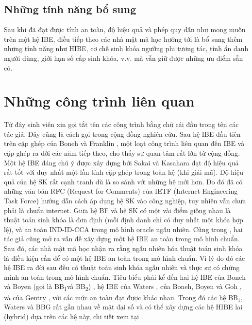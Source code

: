 \documentclass[class=report, crop=false]{standalone}
\begin{document}
		\subsection{Những tính năng bổ sung}
			Sau khi đã đạt được tính an toàn, độ hiệu quả và phép quy dẫn như mong muốn trên một hệ IBE, điều tiếp theo các nhà mật mã học hướng tới là bổ sung thêm những tính năng như HIBE, cơ chế sinh khóa ngưỡng phi tương tác, tính ẩn danh người dùng, giới hạn số cấp sinh khóa, v.v. mà vẫn giữ được những ưu điểm sẵn có.
		
	\section{Những công trình liên quan}
		Từ đây sinh viên xin gọi tắt tên các công trình bằng chữ cái đầu trong tên các tác giả. Đây cũng là cách gọi trong cộng đồng nghiên cứu. Sau hệ IBE đầu tiên trên cặp ghép của Boneh và Franklin \cite{DBLP:conf/crypto/BonehF01}, một loạt công trình liên quan đến IBE và cặp ghép ra đời các năm tiếp theo, cho thấy sự quan tâm rất lớn từ cộng đồng. Một hệ IBE đáng chú ý được xây dựng bởi Sakai và Kasahara \cite{DBLP:journals/iacr/SakaiK03} đạt độ hiệu quả rất tốt với duy nhất một lần tính cặp ghép trong toàn hệ (khi giải mã). Độ hiệu quả của hệ SK rất cạnh tranh dù là so sánh với những hệ mới hơn. Do đó đã có những văn bản RFC (Request for Comments) của IETF (Internet Engineering Task Force) \cite{rfc6508, rfc6509} hướng dẫn cách áp dụng hệ SK vào công nghiệp, tuy nhiên vẫn chưa phải là chuẩn internet. Giữa hệ BF và hệ SK có một vài điểm giống nhau là thuật toán sinh khóa là đơn định (mỗi định danh chỉ có duy nhất một khóa hợp lệ), và an toàn IND-ID-CCA trong mô hình oracle ngẫu nhiên. Cũng trong \cite{DBLP:conf/crypto/BonehF01}, hai tác giả cũng mở ra vấn đề xây dựng một hệ IBE an toàn trong mô hình chuẩn. Sau đó, các nhà mật mã học nhận ra rằng ngẫu nhiên hóa thuật toán sinh khóa là điều kiện cần để có một hệ IBE an toàn trong mô hình chuẩn. Vì lý do đó các hệ IBE ra đời sau đều có thuật toán sinh khóa ngẫu nhiên và thực sự có chứng minh an toàn trong mô hình chuẩn. Tiêu biểu phải kể đến hai hệ IBE của Boneh và Boyen (gọi là BB\textsubscript{1}và BB\textsubscript{2}) \cite{DBLP:journals/joc/BonehB11}, hệ IBE của Waters \cite{DBLP:conf/eurocrypt/Waters05}, của Boneh, Boyen và Goh \cite{DBLP:conf/eurocrypt/BonehBG05}, và của Gentry \cite{DBLP:conf/eurocrypt/Gentry06}, với các mức an toàn đạt được khác nhau. Trong đó các hệ BB$_1$, Waters và BBG rất gần nhau về mặt đại số và có thể xây dựng các hệ HIBE lai (hybrid) dựa trên các hệ này, chi tiết xem tại \cite[mục 4.2]{DBLP:conf/eurocrypt/BonehBG05}.
\end{document}
